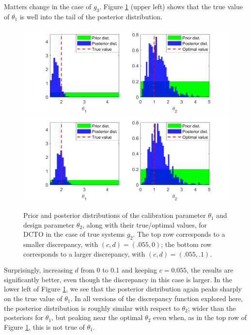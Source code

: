 \documentclass[12pt]{article}
\begin{document}
%
Matters change in the case of $g_3$.
%
Figure \ref{fig:3_discrep_results} (upper left) shows that the true value of $\theta_1$ is well into the tail of the posterior distribution.
%
\begin{figure}
\centering
\includegraphics[scale=0.85]{FIG_discrepancy5_results}
\includegraphics[scale=0.85]{FIG_discrepancy6_results}
\captionsetup{width=.85\linewidth}
\caption{Prior and posterior distributions of the calibration parameter $\theta_1$ and design parameter $\theta_2$, along with their true/optimal values, for DCTO in the case of true systems $g_2$. The top row corresponds to a smaller discrepancy, with $(c,d)=(.055,0)$; the bottom row corresponds to a larger discrepancy, with $(c,d)=(.055,.1)$.}
\label{fig:3_discrep_results}
\end{figure}
%
Surprisingly, increasing $d$ from 0 to 0.1 and keeping $c=0.055$, the results are significantly better, even though the discrepancy in this case is larger.
%
In the lower left of Figure \ref{fig:3_discrep_results}, we see that the posterior distribution again peaks sharply on the true value of $\theta_1$.
%
In all versions of the discrepancy function explored here, the posterior distribution is roughly similar with respect to $\theta_2$; wider than the posteriors for $\theta_1$, but peaking near the optimal $\theta_2$ even when, as in the top row of Figure \ref{fig:3_discrep_results}, this is not true of $\theta_1$.
%
\end{document}
